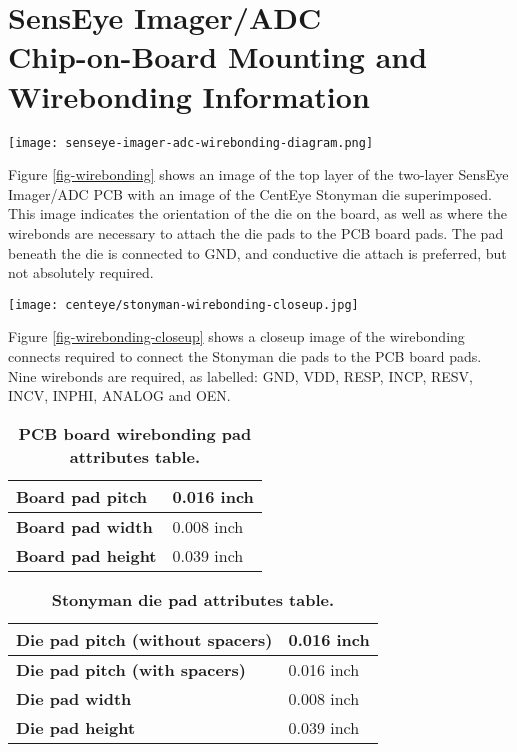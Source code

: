\documentclass[12pt,letterpaper]{report}
\begin{document}
\section*{SensEye Imager/ADC\\Chip-on-Board Mounting and Wirebonding Information}
\begin{figure*}[h!]
 \centering
 \texttt{[image: senseye-imager-adc-wirebonding-diagram.png]}
 \caption[b]{\textbf{SensEye Imager/ADC board wirebonding diagram.}}
 \label{fig-wirebonding}
\end{figure*}

\noindent
Figure \ref{fig-wirebonding} shows an image of the top layer of the two-layer
SensEye Imager/ADC PCB with an image of the CentEye Stonyman die superimposed.
This image indicates the orientation of the die on the board, as well as where
the wirebonds are necessary to attach the die pads to the PCB board pads.  The
pad beneath the die is connected to GND, and conductive die attach is preferred,
but not absolutely required.\\

\begin{figure*}[h!]
 \centering
 \texttt{[image: centeye/stonyman-wirebonding-closeup.jpg]}
 \caption[b]{\textbf{Closeup wirebonding diagram.}}
 \label{fig-wirebonding-closeup}
\end{figure*}

\noindent
Figure \ref{fig-wirebonding-closeup} shows a closeup image of the wirebonding
connects required to connect the Stonyman die pads to the PCB board pads.  Nine
wirebonds are required, as labelled: GND, VDD, RESP, INCP, RESV, INCV, INPHI,
ANALOG and OEN.

\begin{table}[h]
   \centering
   \begin{tabular}{|l|l|}
      \hline
      \textbf{Board pad pitch} & 0.016 inch \\
      \hline
      \textbf{Board pad width} & 0.008 inch \\
      \hline
      \textbf{Board pad height} & 0.039 inch \\
      \hline
   \end{tabular}
   \caption{\textbf{PCB board wirebonding pad attributes table.}}
   \label{table-pads-board}
\end{table}

\begin{table}[h]
   \centering
   \begin{tabular}{|l|l|}
      \hline
      \textbf{Die pad pitch (without spacers)} & 0.016 inch \\
      \hline
      \textbf{Die pad pitch (with spacers)} & 0.016 inch \\
      \hline
      \textbf{Die pad width} & 0.008 inch \\
      \hline
      \textbf{Die pad height} & 0.039 inch \\
      \hline
   \end{tabular}
   \caption{\textbf{Stonyman die pad attributes table.}}
   \label{table-pads-die}
\end{table}
\end{document}
